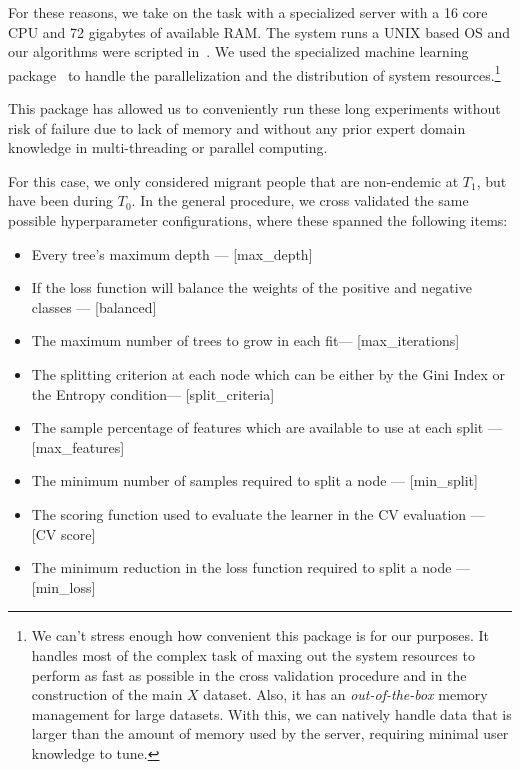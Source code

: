For these reasons, we take on the task with a specialized server with a 16 core CPU and 72 gigabytes of available RAM.\@
The system runs a UNIX based OS and our algorithms were scripted in~\cite{python3.5}.
We used the specialized machine learning package~\cite{graphlab} to handle the parallelization and the distribution of system resources.\footnote{We can't stress enough how convenient this package is for our purposes.
	It handles most of the complex task of maxing out the system resources to perform as fast as possible in the cross validation procedure and in the construction of the main $X$ dataset.
	Also, it has an \textit{out-of-the-box} memory management for large datasets.
	With this, we can natively handle data that is larger than the amount of memory used by the server, requiring minimal user knowledge to tune.}

This package has allowed us to conveniently run these long experiments without risk of failure due to lack of memory and without any prior expert domain knowledge in multi-threading or parallel computing.

For this case, we only considered migrant people that are non-endemic at $T_1$, but have been during $T_0$.
In the general procedure, we cross validated the same possible hyperparameter configurations, where these spanned the following items:

\begin{itemize}\label{list:random_forest_grid_search_params}

  \item Every tree's maximum depth --- [max\_depth]
  \item If the loss function will balance the weights of the positive and negative classes --- [balanced]
  \item The maximum number of trees to grow in each fit--- [max\_iterations]
  \item The splitting criterion at each node which can be either by the Gini Index or the Entropy condition--- [split\_criteria]
  \item The sample percentage of features which are available to use at each split --- [max\_features]
  \item The minimum number of samples required to split a node --- [min\_split]
  \item The scoring function used to evaluate the learner in the CV evaluation --- [CV score]
  \item The minimum reduction in the loss function required to split a node  --- [min\_loss]
\end{itemize}


